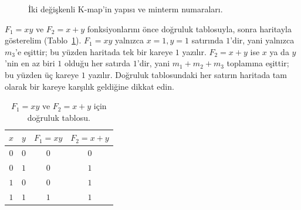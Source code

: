 \begin{figure}[H]
\centering
{}
\caption{İki değişkenli K-map'in yapısı ve minterm numaraları.}
\label{fig:kmap-iki-yapi}
\end{figure}

\begin{ornek}
$F_1=xy$ ve $F_2=x+y$ fonksiyonlarını önce doğruluk tablosuyla, sonra haritayla
gösterelim (Tablo~\ref{tab:kmap-iki-ornek-tt}). $F_1=xy$ yalnızca $x=1,y=1$ satırında
$1$'dir, yani yalnızca $m_3$'e eşittir; bu yüzden haritada tek bir kareye $1$ yazılır.
$F_2=x+y$ ise $x$ ya da $y$'nin en az biri $1$ olduğu her satırda $1$'dir, yani
$m_1+m_2+m_3$ toplamına eşittir; bu yüzden üç kareye $1$ yazılır. Doğruluk tablosundaki
her satırın haritada tam olarak bir kareye karşılık geldiğine dikkat edin.

\begin{table}[H]
\centering
\begin{tabular}{cc|cc}
\toprule
$x$ & $y$ & $F_1=xy$ & $F_2=x+y$ \\
\midrule
$0$ & $0$ & $0$ & $0$ \\
$0$ & $1$ & $0$ & $1$ \\
$1$ & $0$ & $0$ & $1$ \\
$1$ & $1$ & $1$ & $1$ \\
\bottomrule
\end{tabular}
\caption{$F_1=xy$ ve $F_2=x+y$ için doğruluk tablosu.}
\label{tab:kmap-iki-ornek-tt}
\end{table}

\begin{center}
\hspace{2cm}
\end{center}
\label{fig:kmap-iki-ornek}
\end{ornek}

